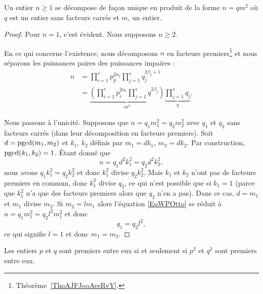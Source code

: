 \begin{lemma}   \label{LemheKdsa}
    Un entier \( n\geq 1\) se décompose de façon unique en produit de la forme \( n=qm^2\) où \( q\) est un entier sans facteurs carrés et \( m\), un entier.
\end{lemma}

\begin{proof}
    Pour \( n=1\), c'est évident. Nous supposons \( n\geq 2\).

    En ce qui concerne l'existence, nous décomposons \( n\) en facteurs premiers\footnote{Théorème~\ref{ThoAJFJooAveRvY}.} et nous séparons les puissances paires des puissances impaires :
    \begin{subequations}
        \begin{align}
            n&=\prod_{i=1}^rp_p^{2\alpha_i}\prod_{j=1}^sq_{j}^{2\beta_j+1}\\
            &=\underbrace{\left( \prod_{i=1}^rp_i^{2\alpha_i}\prod_{j=1}^sq^{2\beta_j} \right)}_{m^2}\underbrace{\prod_{j=1}^sq_j}_{q}.
        \end{align}
    \end{subequations}

    Nous passons à l'unicité. Supposons que \( n=q_1m_1^2=q_2m_2^2\) avec \( q_1\) et \( q_2\) sans facteurs carrés (dans leur décomposition en facteurs premiers). Soit \( d=\operatorname{pgcd}(m_1,m_2)\) et \( k_1\), \( k_2\) définis par \( m_1=dk_1\), \( m_2=dk_2\). Par construction, \( \operatorname{pgcd}(k_1,k_2)=1\). Étant donné que
    \begin{equation}        \label{EqWPOtto}
        n=q_1d^2k_1^2=q_2d^2k_2^2,
    \end{equation}
    nous avons \( q_1k_1^2=q_2k_2^2\) et donc \( k_1^2\) divise \( q_2k_2^2\). Mais \( k_1\) et \( k_2\) n'ont pas de facteurs premiers en commun, donc \( k_1^2\) divise \( q_2\), ce qui n'est possible que si \( k_1=1\) (parce que \( k_1^2\) n'a que des facteurs premiers alors que \( q_2\) n'en a pas). Dans ce cas, \( d=m_1\) et \( m_1\) divise \( m_2\). Si \( m_2=lm_1\) alors l'équation \eqref{EqWPOtto} se réduit à  \( n=q_1m_1^2=q_2l^2m_1^2\) et donc
    \begin{equation}
        q_1=q_2l^2,
    \end{equation}
    ce qui signifie \( l=1\) et donc \( m_1=m_2\).
\end{proof}


\begin{proposition}     \label{PROPooRZDDooLJabov}
    Les entiers \( p\) et \( q\) sont premiers entre eux si et seulement si \( p^2\) et \( q^2\) sont premiers entre eux.
\end{proposition}

